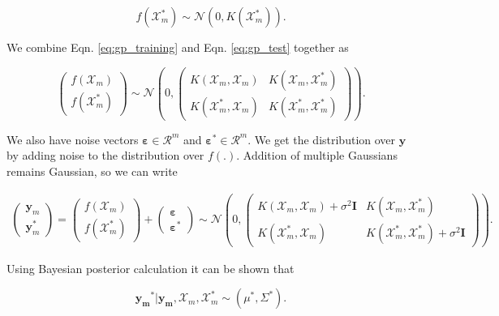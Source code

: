\documentclass[english]{tktltiki}
\begin{document}
\begin{equation}
f(\mathcal{X}_m^*) \sim \mathcal{N} (0, K(\mathcal{X}_m^*)).
\label{eq:gp_test}
\end{equation}

We combine Eqn. \ref{eq:gp_training} and Eqn. \ref{eq:gp_test} together as

\begin{equation}
\begin{pmatrix}
f(\mathcal{X}_m) \\
f(\mathcal{X}_m^*)
\end{pmatrix}
\sim \mathcal{N} \left( %
0, %
\begin{pmatrix}
K(\mathcal{X}_m, \mathcal{X}_m) & K(\mathcal{X}_m, \mathcal{X}_m^*) \\
K(\mathcal{X}_m^*, \mathcal{X}_m) & K(\mathcal{X}_m^*, \mathcal{X}_m^*)
\end{pmatrix}\right).
\end{equation}

We also have noise vectors $\mathbf{\varepsilon} \in \mathcal{R}^m$ and $\mathbf{\varepsilon^*} \in \mathcal{R}^m$. We get the distribution over $\mathbf{y}$ by adding noise to the distribution over $f(.)$. Addition of multiple Gaussians remains Gaussian, so we can write

\begin{eqnarray}
\begin{pmatrix}
\mathbf{y}_m \\
\mathbf{y}_m^*
\end{pmatrix}
= %
\begin{pmatrix}
f(\mathcal{X}_m) \\
f(\mathcal{X}_m^*)
\end{pmatrix}
+%
\begin{pmatrix}
\mathbf{\varepsilon} \\
\mathbf{\varepsilon^*}
\end{pmatrix}
\sim \mathcal{N} \left( %
0, %
\begin{pmatrix}
K(\mathcal{X}_m, \mathcal{X}_m) + \sigma^2 \mathbf{I} & K(\mathcal{X}_m, \mathcal{X}_m^*) \\
K(\mathcal{X}_m^*, \mathcal{X}_m) & K(\mathcal{X}_m^*, \mathcal{X}_m^*) + \sigma^2 \mathbf{I}
\end{pmatrix}\right).
\end{eqnarray}

Using Bayesian posterior calculation it can be shown that

\begin{equation}
\mathbf{y_m}^* | \mathbf{y_m}, \mathcal{X}_m, \mathcal{X}_m^* \sim (\mu^*, \Sigma^*).
\end{equation}
\end{document}
